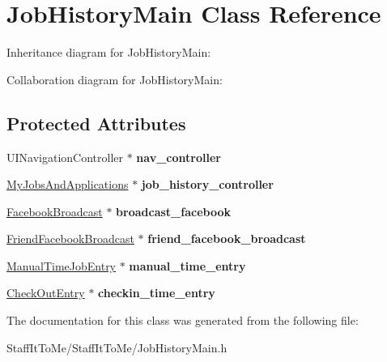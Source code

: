 \hypertarget{interface_job_history_main}{
\section{\-Job\-History\-Main \-Class \-Reference}
\label{interface_job_history_main}
}


\-Inheritance diagram for \-Job\-History\-Main\-:


\-Collaboration diagram for \-Job\-History\-Main\-:
\subsection*{\-Protected \-Attributes}
\begin{DoxyCompactItemize}
\item 
\hypertarget{interface_job_history_main_a5a27f203ce246994db5141ccbcf1aab0}{
\-U\-I\-Navigation\-Controller $\ast$ {\bfseries nav\-\_\-controller}}
\label{interface_job_history_main_a5a27f203ce246994db5141ccbcf1aab0}

\item 
\hypertarget{interface_job_history_main_a807bb0f490cf98fe769bab7480c22481}{
\hyperlink{interface_my_jobs_and_applications}{\-My\-Jobs\-And\-Applications} $\ast$ {\bfseries job\-\_\-history\-\_\-controller}}
\label{interface_job_history_main_a807bb0f490cf98fe769bab7480c22481}

\item 
\hypertarget{interface_job_history_main_a7156a9dd2ed5004f92ef778068771b38}{
\hyperlink{interface_facebook_broadcast}{\-Facebook\-Broadcast} $\ast$ {\bfseries broadcast\-\_\-facebook}}
\label{interface_job_history_main_a7156a9dd2ed5004f92ef778068771b38}

\item 
\hypertarget{interface_job_history_main_ad13628c8b0fb0bdd22da88e9358f83ce}{
\hyperlink{interface_friend_facebook_broadcast}{\-Friend\-Facebook\-Broadcast} $\ast$ {\bfseries friend\-\_\-facebook\-\_\-broadcast}}
\label{interface_job_history_main_ad13628c8b0fb0bdd22da88e9358f83ce}

\item 
\hypertarget{interface_job_history_main_ac41939a2323b6aa48b5c23580f1e88ae}{
\hyperlink{interface_manual_time_job_entry}{\-Manual\-Time\-Job\-Entry} $\ast$ {\bfseries manual\-\_\-time\-\_\-entry}}
\label{interface_job_history_main_ac41939a2323b6aa48b5c23580f1e88ae}

\item 
\hypertarget{interface_job_history_main_a2fbcd24fee42fcc102a320d09f691336}{
\hyperlink{interface_check_out_entry}{\-Check\-Out\-Entry} $\ast$ {\bfseries checkin\-\_\-time\-\_\-entry}}
\label{interface_job_history_main_a2fbcd24fee42fcc102a320d09f691336}

\end{DoxyCompactItemize}


\-The documentation for this class was generated from the following file\-:\begin{DoxyCompactItemize}
\item 
\-Staff\-It\-To\-Me/\-Staff\-It\-To\-Me/\-Job\-History\-Main.\-h\end{DoxyCompactItemize}
